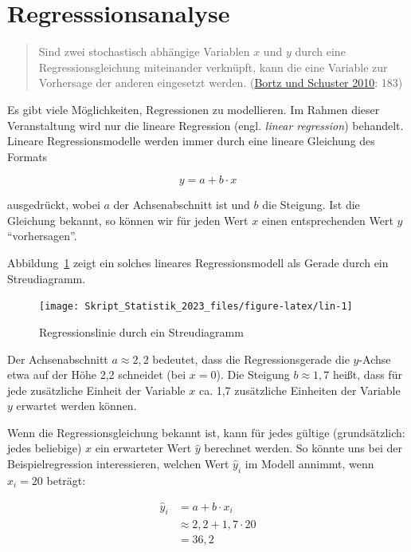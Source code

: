 \documentclass[
  11pt,
  ngerman,
  a4paper,
]{report}
\begin{document}
\hypertarget{regresssionsanalyse}{%
\section{Regresssionsanalyse}\label{regresssionsanalyse}}

\begin{quote}
Sind zwei stochastisch abhängige Variablen \(x\) und \(y\) durch eine Regressionsgleichung miteinander verknüpft, kann die eine Variable zur Vorhersage der anderen eingesetzt werden. (\protect\hyperlink{ref-bortz}{Bortz und Schuster 2010}: 183)
\end{quote}

Es gibt viele Möglichkeiten, Regressionen zu modellieren. Im Rahmen dieser Veranstaltung wird nur die lineare Regression (engl. \emph{linear regression}) behandelt. Lineare Regressionsmodelle werden immer durch eine lineare Gleichung des Formats

\[
y=a+b\cdot x
\label{eq:lin}
\]

ausgedrückt, wobei \(a\) der Achsenabschnitt ist und \(b\) die Steigung. Ist die Gleichung bekannt, so können wir für jeden Wert \(x\) einen entsprechenden Wert \(y\) \enquote{vorhersagen}.

Abbildung~\ref{fig:lin} zeigt ein solches lineares Regressionsmodell als Gerade durch ein Streudiagramm.

\begin{figure}[!h]

{\centering \texttt{[image: Skript\_Statistik\_2023\_files/figure-latex/lin-1]} 

}

\caption{Regressionslinie durch ein Streudiagramm}\label{fig:lin}
\end{figure}

Der Achsenabschnitt \(a\approx2,2\) bedeutet, dass die Regressionsgerade die \(y\)-Achse etwa auf der Höhe 2,2 schneidet (bei \(x=0\)). Die Steigung \(b\approx1,7\) heißt, dass für jede zusätzliche Einheit der Variable \(x\) ca. 1,7 zusätzliche Einheiten der Variable \(y\) erwartet werden können.

Wenn die Regressionsgleichung bekannt ist, kann für jedes gültige (grundsätzlich: jedes beliebige) \(x\) ein erwarteter Wert \(\hat{y}\) berechnet werden. So könnte uns bei der Beispielregression interessieren, welchen Wert \(\hat{y}_i\) im Modell annimmt, wenn \(x_i=20\) beträgt:

\[
\begin{aligned}
\hat{y}_i&=a+b\cdot x_i\\
   &\approx2{,}2+1{,}7\cdot20\\
   &=36{,}2
\end{aligned}
\]
\end{document}
